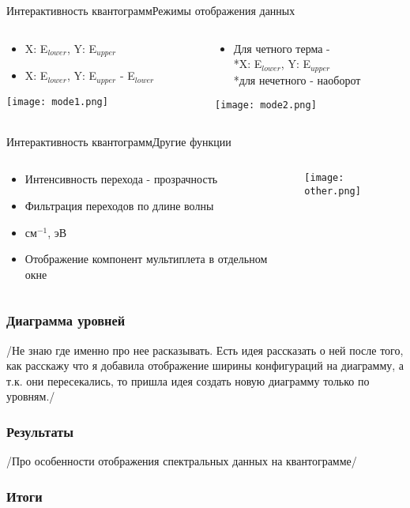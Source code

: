 \documentclass{beamer}
\begin{document}
\begin{frame}{Интерактивность квантограмм}{Режимы отображения данных}
\begin{columns}
    \begin{column}{0.5\textwidth}
    \begin{itemize}
        \item X: E$_{lower}$, Y: E$_{upper}$
        \item  X: E$_{lower}$, Y: E$_{upper}$ - E$_{lower}$
    \end{itemize}
         \texttt{[image: mode1.png]}
    \end{column}
    \begin{column}{0.5\textwidth}
      \begin{itemize}
        \item Для четного терма - \\*X: E$_{lower}$, Y: E$_{upper}$
        \\*для нечетного - наоборот
    \end{itemize}
      \texttt{[image: mode2.png]}
    \end{column}
  \end{columns}
\end{frame}

\begin{frame}{Интерактивность квантограмм}{Другие функции}
   \begin{columns}
    \begin{column}{0.27\textwidth}
        \begin{block}{}
             \begin{itemize}
                \item Интенсивность перехода - прозрачность
                \item Фильтрация переходов по длине волны
                \item см$^{-1}$, эВ
                \item Отображение компонент мультиплета в отдельном окне
            \end{itemize}
        \end{block}
    \end{column}
    \begin{column}{0.73\textwidth}
    \texttt{[image: other.png]}
    \end{column}
  \end{columns}
\end{frame}

\begin{frame}
\frametitle{Диаграмма уровней}
    /Не знаю где именно про нее расказывать. Есть идея рассказать о ней после того, как расскажу что я добавила отображение ширины конфигураций на диаграмму, а т.к. они пересекались, то пришла идея создать новую диаграмму только по уровням./
\end{frame}

\begin{frame}
\frametitle{Результаты }
    /Про особенности отображения спектральных данных на квантограмме/
\end{frame}

\begin{frame}
\frametitle{Итоги }
  
\end{frame}
\end{document}
